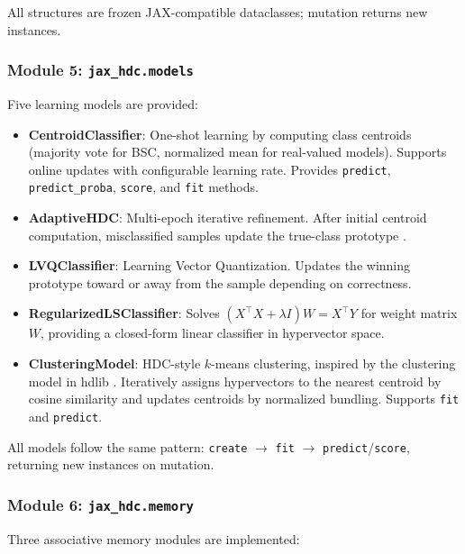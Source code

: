 \documentclass[twoside,11pt]{article}
\begin{document}
All structures are frozen JAX-compatible dataclasses; mutation returns new instances.

\subsubsection{Module 5: \texttt{jax\_hdc.models}}

Five learning models are provided:

\begin{itemize}
\item \textbf{CentroidClassifier}: One-shot learning by computing class centroids (majority vote for BSC, normalized mean for real-valued models). Supports online updates with configurable learning rate. Provides \texttt{predict}, \texttt{predict\_proba}, \texttt{score}, and \texttt{fit} methods.
\item \textbf{AdaptiveHDC}: Multi-epoch iterative refinement. After initial centroid computation, misclassified samples update the true-class prototype \citep{imani2017voicehd}.
\item \textbf{LVQClassifier}: Learning Vector Quantization. Updates the winning prototype toward or away from the sample depending on correctness.
\item \textbf{RegularizedLSClassifier}: Solves $(X^\top X + \lambda I) W = X^\top Y$ for weight matrix $W$, providing a closed-form linear classifier in hypervector space.
\item \textbf{ClusteringModel}: HDC-style $k$-means clustering, inspired by the clustering model in hdlib \citep{cumbo2023hdlib}. Iteratively assigns hypervectors to the nearest centroid by cosine similarity and updates centroids by normalized bundling. Supports \texttt{fit} and \texttt{predict}.
\end{itemize}

All models follow the same pattern: \texttt{create} $\to$ \texttt{fit} $\to$ \texttt{predict}/\texttt{score}, returning new instances on mutation.

\subsubsection{Module 6: \texttt{jax\_hdc.memory}}

Three associative memory modules are implemented:
\end{document}
